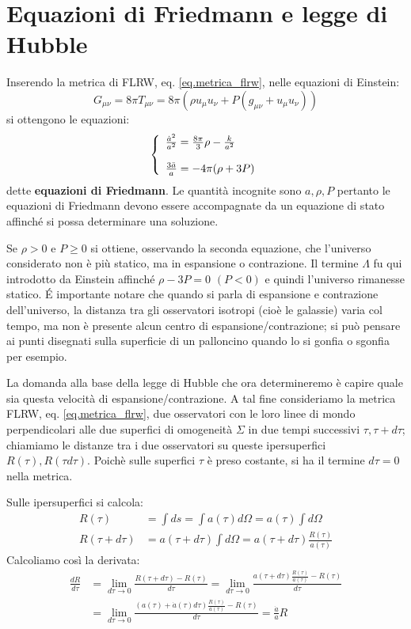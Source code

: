 \section{Equazioni di Friedmann e legge di Hubble}
Inserendo la metrica di FLRW, eq. \ref{eq.metrica_flrw}, nelle equazioni di Einstein:
\begin{equation*}
    G_{\mu\nu} = 8\pi T_{\mu\nu} = 8\pi( \rho u_\mu u_\nu + P(g_{\mu\nu} +u_\mu u_\nu))
\end{equation*}
si ottengono le equazioni:
\begin{equation}
    \left\{\begin{array}{l}
      \frac{\Dot{a}^2}{a^2} = \frac{8\pi}{3}\rho - \frac{k}{a^2} \\ \\
      \frac{3 \Ddot{a}}{a} = - 4\pi (\rho + 3P)
    \end{array}\right.
    \label{eq.equazioni_friedmann}
\end{equation}
dette \textbf{equazioni di Friedmann}. Le quantità incognite sono $a, \rho, P$ pertanto le equazioni di Friedmann devono essere accompagnate da un equazione di stato affinché si possa determinare una soluzione.

Se $\rho >0$ e $P \geq 0$ si ottiene, osservando la seconda equazione, che l'universo considerato non è più statico, ma in espansione o contrazione. Il termine $\Lambda$ fu qui introdotto da Einstein affinché $\rho -3P =0$ $(P<0)$ e quindi l'universo rimanesse statico.
\'E importante notare che quando si parla di espansione e contrazione dell'universo, la distanza tra gli osservatori isotropi (cioè le galassie) varia col tempo, ma non è presente alcun centro di espansione/contrazione; si può pensare ai punti disegnati sulla superficie di un palloncino quando lo si gonfia o sgonfia per esempio.

La domanda alla base della legge di Hubble che ora determineremo è capire quale sia questa velocità di espansione/contrazione. A tal fine consideriamo la metrica FLRW, eq. \ref{eq.metrica_flrw}, due osservatori con le loro linee di mondo perpendicolari alle due superfici di omogeneità $\Sigma$ in due tempi successivi $\tau, \tau + d\tau$; chiamiamo le distanze tra i due osservatori su queste ipersuperfici $R(\tau), R(\tau d\tau)$. Poichè sulle superfici $\tau$ è preso costante, si ha il termine $d\tau=0$ nella metrica.

Sulle ipersuperfici si calcola:
\begin{align*}
    R(\tau) &= \int ds = \int a(\tau)d\Omega = a(\tau) \int d\Omega \\
    R(\tau + d\tau) &= a(\tau +d\tau)\int d\Omega = a(\tau +d\tau) \frac{R(\tau)}{a(\tau)}
\end{align*}
Calcoliamo così la derivata:
\begin{align*}
    \frac{dR}{d\tau} &= \lim_{d\tau \rightarrow 0} \frac{   R(\tau + d\tau)-   R(\tau)}{d\tau} = \lim_{d\tau \rightarrow 0}  \frac{a(\tau +d\tau) \frac{R(\tau)}{a(\tau)} -  R(\tau)}{d\tau} \\
    &= \lim_{d\tau \rightarrow 0}  \frac{(a(\tau)+ \Dot{a}(\tau)d\tau) \frac{R(\tau)}{a(\tau)} -  R(\tau)}{d\tau} =\frac{\Dot{a}}{a} R
\end{align*}

